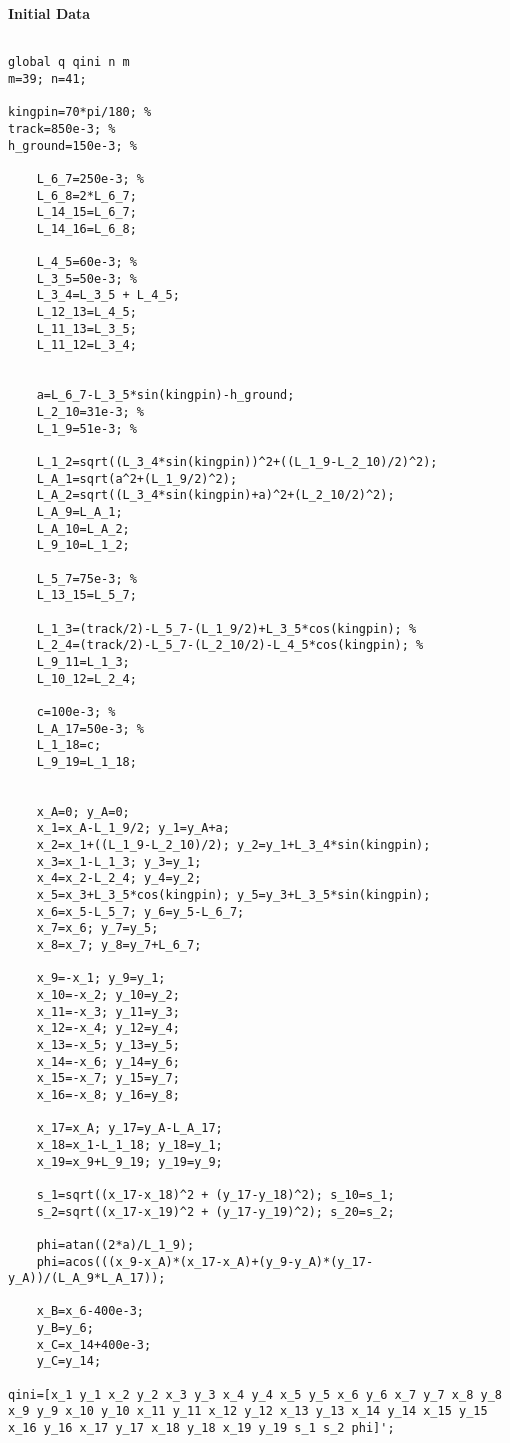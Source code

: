 \textbf{Initial Data}
\begin{lstlisting}[style=codematlab]

global q qini n m
m=39; n=41;

kingpin=70*pi/180; %
track=850e-3; %
h_ground=150e-3; %

    L_6_7=250e-3; %
    L_6_8=2*L_6_7;
    L_14_15=L_6_7;
    L_14_16=L_6_8;
    
    L_4_5=60e-3; %
    L_3_5=50e-3; %
    L_3_4=L_3_5 + L_4_5;
    L_12_13=L_4_5;
    L_11_13=L_3_5;
    L_11_12=L_3_4;
    
    
    a=L_6_7-L_3_5*sin(kingpin)-h_ground;
    L_2_10=31e-3; %
    L_1_9=51e-3; %

    L_1_2=sqrt((L_3_4*sin(kingpin))^2+((L_1_9-L_2_10)/2)^2);
    L_A_1=sqrt(a^2+(L_1_9/2)^2);
    L_A_2=sqrt((L_3_4*sin(kingpin)+a)^2+(L_2_10/2)^2);
    L_A_9=L_A_1;
    L_A_10=L_A_2;
    L_9_10=L_1_2;
    
    L_5_7=75e-3; %
    L_13_15=L_5_7;
    
    L_1_3=(track/2)-L_5_7-(L_1_9/2)+L_3_5*cos(kingpin); %
    L_2_4=(track/2)-L_5_7-(L_2_10/2)-L_4_5*cos(kingpin); %
    L_9_11=L_1_3;
    L_10_12=L_2_4;

    c=100e-3; %
    L_A_17=50e-3; %
    L_1_18=c;
    L_9_19=L_1_18;
    

    x_A=0; y_A=0;
    x_1=x_A-L_1_9/2; y_1=y_A+a;
    x_2=x_1+((L_1_9-L_2_10)/2); y_2=y_1+L_3_4*sin(kingpin);
    x_3=x_1-L_1_3; y_3=y_1;
    x_4=x_2-L_2_4; y_4=y_2;
    x_5=x_3+L_3_5*cos(kingpin); y_5=y_3+L_3_5*sin(kingpin);
    x_6=x_5-L_5_7; y_6=y_5-L_6_7;
    x_7=x_6; y_7=y_5;
    x_8=x_7; y_8=y_7+L_6_7;
    
    x_9=-x_1; y_9=y_1;
    x_10=-x_2; y_10=y_2;
    x_11=-x_3; y_11=y_3;
    x_12=-x_4; y_12=y_4;
    x_13=-x_5; y_13=y_5;
    x_14=-x_6; y_14=y_6;
    x_15=-x_7; y_15=y_7;
    x_16=-x_8; y_16=y_8;
    
    x_17=x_A; y_17=y_A-L_A_17;
    x_18=x_1-L_1_18; y_18=y_1;
    x_19=x_9+L_9_19; y_19=y_9;
    
    s_1=sqrt((x_17-x_18)^2 + (y_17-y_18)^2); s_10=s_1;
    s_2=sqrt((x_17-x_19)^2 + (y_17-y_19)^2); s_20=s_2;
    
    phi=atan((2*a)/L_1_9);
    phi=acos(((x_9-x_A)*(x_17-x_A)+(y_9-y_A)*(y_17-y_A))/(L_A_9*L_A_17));
    
    x_B=x_6-400e-3;
    y_B=y_6;
    x_C=x_14+400e-3;
    y_C=y_14;

qini=[x_1 y_1 x_2 y_2 x_3 y_3 x_4 y_4 x_5 y_5 x_6 y_6 x_7 y_7 x_8 y_8 x_9 y_9 x_10 y_10 x_11 y_11 x_12 y_12 x_13 y_13 x_14 y_14 x_15 y_15 x_16 y_16 x_17 y_17 x_18 y_18 x_19 y_19 s_1 s_2 phi]';


\end{lstlisting}

